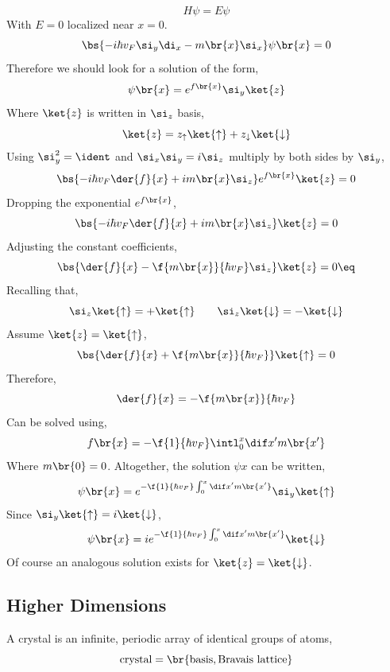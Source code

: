 \documentclass{article}
\newcommand{\uu}{\uparrow}
\newcommand{\dd}{\downarrow}
\begin{document}
\[  H \psi = E \psi \]
With $E = 0$ localized near $x = 0$.
\[ \bs{- i \hbar v_F \si_y \di_x - m\br{x} \si_x} \psi\br{x} = 0 \]
Therefore we should look for a solution of the form,
\[ \psi\br{x} = e^{f\br{x}} \si_y \ket{z} \]
Where $\ket{z}$ is written in $\si_z$ basis,
\[ \ket{z} = z_{\uu} \ket{\uu} + z_{\dd} \ket{\dd} \]
Using $\si_y^2 = \ident$ and $\si_x \si_y = i \si_z$ multiply by both sides by $\si_y$,
\[ \bs{-i \hbar v_F \der{f}{x} + i m\br{x} \si_z} e^{f\br{x}}\ket{z} = 0 \]
Dropping the exponential $e^{f\br{x}}$,
\[ \bs{-i \hbar v_F \der{f}{x} + i m\br{x} \si_z} \ket{z} = 0 \]
Adjusting the constant coefficients,
\[ \bs{\der{f}{x} - \f{m\br{x}}{\hbar v_F} \si_z} \ket{z} = 0 \eq \label{eq:mass_varying_eqn}\]
Recalling that,
\[ \si_{z}\ket{\uu} = + \ket{\uu} \qquad \si_{z}\ket{\dd} = - \ket{\dd} \]
Assume $\ket{z} = \ket{\uu}$,
\[ \bs{\der{f}{x} + \f{m\br{x}}{\hbar v_F}} \ket{\uu} = 0 \]
Therefore,
\[ \der{f}{x} = - \f{m\br{x}}{\hbar v_F} \]
Can be solved using,
\[ f\br{x} = - \f{1}{\hbar v_F} \intl_{0}^{x} \dif x' m\br{x'} \]
Where $m\br{0} = 0$. Altogether, the solution $\psi{x}$ can be written,
\[ \psi\br{x} = e^{- \f{1}{\hbar v_F} \int_{0}^{x} \dif x' m\br{x'}} \si_y \ket{\uu} \]
Since $\si_y \ket{\uu} = i \ket{\dd}$,
\[ \psi\br{x} = ie^{- \f{1}{\hbar v_F} \int_{0}^{x} \dif x' m\br{x'}}\ket{\dd} \]
Of course an analogous solution exists for $\ket{z} = \ket{\dd}$.
\begin{center}
\end{center}

\subsection{Higher Dimensions}

A crystal is an infinite, periodic array of identical groups of atoms,
\[ \text{crystal} = \br{\text{basis}, \text{Bravais lattice}} \]

\begin{center}
\end{center}
\end{document}
